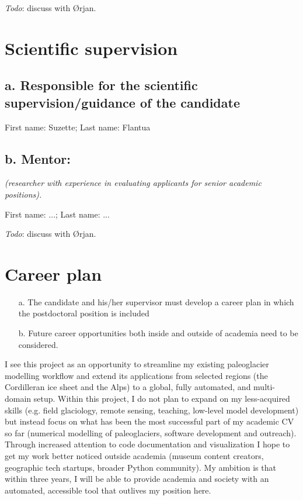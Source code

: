 \documentclass{article}
\renewcommand{\cvdoubleitem}[4]{#1: #2; #3: #4}
\newcommand{\names}[2]{\cvdoubleitem{First name}{#1}{Last name}{#2}}
\newcommand{\guideline}[1]{{\color{color2}\itshape{#1}}}
\newcommand{\todo}[1]{{\color{red}\emph{Todo}: #1}}
\begin{document}
    \todo{discuss with Ørjan.}

\section{Scientific supervision}

\subsection{a. Responsible for the scientific supervision/guidance of the
            candidate}

    \names{Suzette}{Flantua}

\subsection{b. Mentor:}

    \guideline{
        (researcher with experience in evaluating applicants for senior
        academic positions).}

    \names{...}{...}

    \todo{discuss with Ørjan.}


\section{Career plan}

    \guideline{
        \begin{itemize}
          \item[a.] The candidate and his/her supervisor must develop a career
            plan in which the postdoctoral position is included
          \item[b.] Future career opportunities both inside and outside of
            academia need to be considered.
        \end{itemize}}

    I see this project as an opportunity to streamline my existing paleoglacier
    modelling workflow and extend its applications from selected regions (the
    Cordilleran ice sheet and the Alps) to a global, fully automated, and
    multi-domain setup. Within this project, I do not plan to expand on my
    less-acquired skills (e.g. field glaciology, remote sensing, teaching,
    low-level model development) but instead focus on what has been the most
    successful part of my academic CV so far (numerical modelling of
    paleoglaciers, software development and outreach). Through increased
    attention to code documentation and visualization I hope to get my work
    better noticed outside academia (museum content creators, geographic tech
    startups,  broader Python community). My ambition is that within three
    years, I will be able to provide academia and society with an automated,
    accessible tool that outlives my position here.
\end{document}
